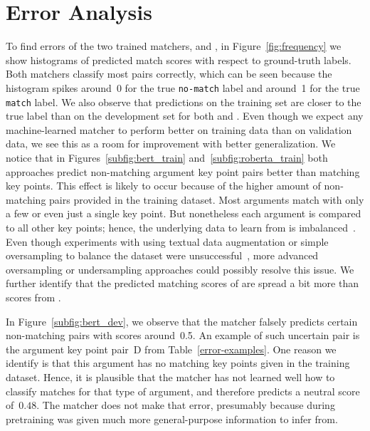 \section{Error Analysis}\label{error-analysis}




To find errors of the two trained matchers, \BertBase and \RobertaBase, in Figure~\ref{fig:frequency} we show 
histograms of predicted match scores with respect to ground-truth labels.
Both matchers classify most pairs correctly, which can be seen because the histogram spikes around~0 for the 
true \texttt{no-match} label and around~1 for the true \texttt{match} label.
We also observe that predictions on the training set are closer to the true label than on the development set for both \RobertaBase and \BertBase. 
Even though we expect any machine-learned matcher to perform better on training data than on validation data, 
we see this as a room for improvement with better generalization.
We notice that in Figures~\ref{subfig:bert_train} and~\ref{subfig:roberta_train} both approaches predict non-matching 
argument key point pairs better than matching key points.
This effect is likely to occur because of the higher amount of non-matching pairs provided in the training dataset.
Most arguments match with only a few or even just a single key point.
But nonetheless each argument is compared to all other key points; hence, the underlying data to learn from is 
imbalanced~\cite{BarandelaVSF2004}.
Even though experiments with using textual data augmentation or simple oversampling to balance the dataset were 
unsuccessful~\cite{Dietterich1995}, more advanced oversampling or undersampling approaches could possibly resolve this issue.
We further identify that the predicted matching scores of \BertBase are spread a 
bit more than scores from \RobertaBase.

In Figure~\ref{subfig:bert_dev}, we observe that the \BertBase matcher falsely predicts certain non-matching pairs with scores around~0.5.
An example of such uncertain pair is the argument key point pair~D from Table~\ref{error-examples}.
One reason we identify is that this argument has no matching key points given in the training dataset.
Hence, it is plausible that the \mbox{\BertBase} matcher has not learned well how to classify matches for that type of 
argument, and therefore predicts a neutral score of~\(0.48\).
The \RobertaBase matcher does not make that error, presumably because during pretraining \Roberta was given much 
more general-purpose information to infer from.

